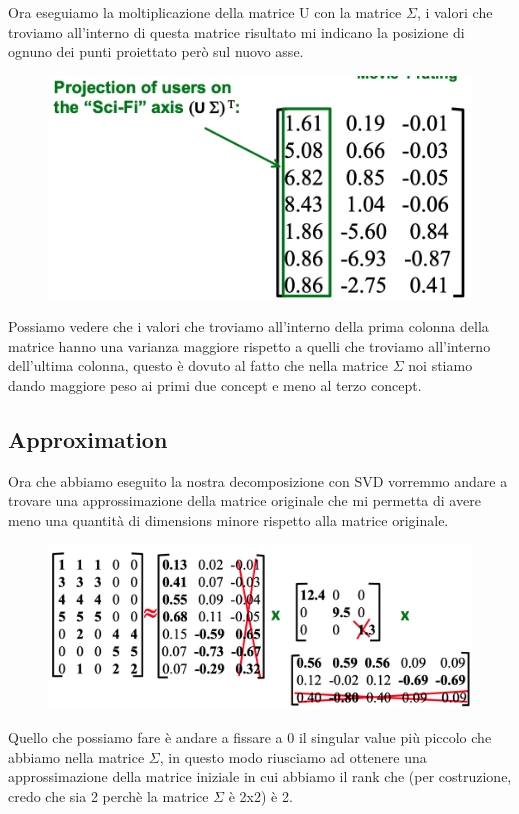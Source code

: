 \documentclass[14pt]{extreport}
\begin{document}
Ora eseguiamo la moltiplicazione della matrice U con la matrice $\Sigma$, i valori che troviamo all'interno di questa matrice risultato mi indicano la posizione 
di ognuno dei punti proiettato però sul nuovo asse.


\begin{figure}[H] 
	\centering
	\includegraphics[width=0.7\linewidth]{505.jpeg}
	\end{figure}


Possiamo vedere che i valori che troviamo all'interno della prima colonna della matrice hanno una varianza maggiore rispetto a quelli che troviamo all'interno dell'ultima
colonna, questo è dovuto al fatto che nella matrice $\Sigma$ noi stiamo dando maggiore peso ai primi due concept e meno al terzo concept.

\subsection{Approximation}

Ora che abbiamo eseguito la nostra decomposizione con SVD vorremmo andare a trovare una approssimazione della matrice originale che mi permetta di avere meno una 
quantità di dimensions minore rispetto alla matrice originale.

\begin{figure}[H] 
\centering
\includegraphics[width=0.7\linewidth]{506.jpeg}
\end{figure}

Quello che possiamo fare è andare a fissare a 0 il singular value più piccolo che abbiamo nella matrice $\Sigma$, in questo modo riusciamo ad ottenere 
una approssimazione della matrice iniziale in cui abbiamo il rank che (per costruzione, credo che sia 2 perchè la matrice $\Sigma$ è 2x2) è 2.
\end{document}
